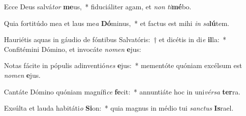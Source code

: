 \item Ecce Deus salvá\textit{tor} \textbf{me}us,~* fiduciáliter agam, et \textit{non} \textit{ti}\textbf{mé}bo.
\item Quia fortitúdo mea et laus me\textit{a} \textbf{Dó}minus,~* et factus est mihi \textit{in} \textit{sa}\textbf{lú}tem.
\item Hauriétis aquas in gáudio de fóntibus Salvatóris:~† et dicétis in di\textit{e} \textbf{il}la:~* Confitémini Dómino, et invocáte \textit{no}\textit{men} \textbf{e}jus:
\item Notas fácite in pópulis adinventió\textit{nes} \textbf{e}jus:~* mementóte quóniam excélsum est \textit{no}\textit{men} \textbf{e}jus.
\item Cantáte Dómino quóniam magnífi\textit{ce} \textbf{fe}cit:~* annuntiáte hoc in uni\textit{vér}\textit{sa} \textbf{ter}ra.
\item Exsúlta et lauda habitáti\textit{o} \textbf{Si}on:~* quia magnus in médio tui \textit{sanc}\textit{tus} \textbf{Is}rael.
